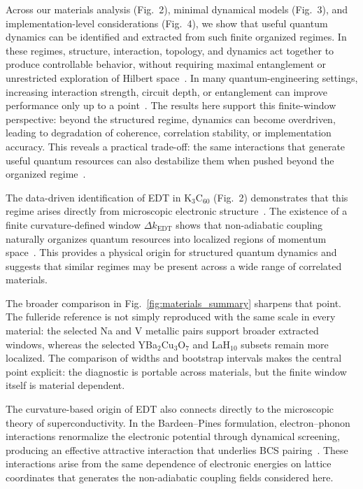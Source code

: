 \documentclass[twocolumn,10pt]{article}
\begin{document}
Across our materials analysis (Fig.~2), minimal dynamical models (Fig.~3), and implementation-level considerations (Fig.~4), we show that useful quantum dynamics can be identified and extracted from such finite organized regimes. In these regimes, structure, interaction, topology, and dynamics act together to produce controllable behavior, without requiring maximal entanglement or unrestricted exploration of Hilbert space~\cite{Amico2008,Eisert2010}. In many quantum-engineering settings, increasing interaction strength, circuit depth, or entanglement can improve performance only up to a point~\cite{Preskill2018}. The results here support this finite-window perspective: beyond the structured regime, dynamics can become overdriven, leading to degradation of coherence, correlation stability, or implementation accuracy. This reveals a practical trade-off: the same interactions that generate useful quantum resources can also destabilize them when pushed beyond the organized regime~\cite{Altman2015,Swingle2018}.

The data-driven identification of EDT in K$_3$C$_{60}$ (Fig.~2) demonstrates that this regime arises directly from microscopic electronic structure~\cite{Gunnarsson1997,Capone2009}. The existence of a finite curvature-defined window $\Delta k_{\mathrm{EDT}}$ shows that non-adiabatic coupling naturally organizes quantum resources into localized regions of momentum space~\cite{Mead1979,Yarkony1996}. This provides a physical origin for structured quantum dynamics and suggests that similar regimes may be present across a wide range of correlated materials.

The broader comparison in Fig.~\ref{fig:materials_summary} sharpens that point. The fulleride reference is not simply reproduced with the same scale in every material: the selected Na and V metallic pairs support broader extracted windows, whereas the selected YBa$_2$Cu$_3$O$_7$ and LaH$_{10}$ subsets remain more localized. The comparison of widths and bootstrap intervals makes the central point explicit: the diagnostic is portable across materials, but the finite window itself is material dependent.

The curvature-based origin of EDT also connects directly to the microscopic theory of superconductivity. In the Bardeen--Pines formulation, electron--phonon interactions renormalize the electronic potential through dynamical screening, producing an effective attractive interaction that underlies BCS pairing~\cite{BardeenPines1955,BCS1957}. These interactions arise from the same dependence of electronic energies on lattice coordinates that generates the non-adiabatic coupling fields considered here.
\end{document}
